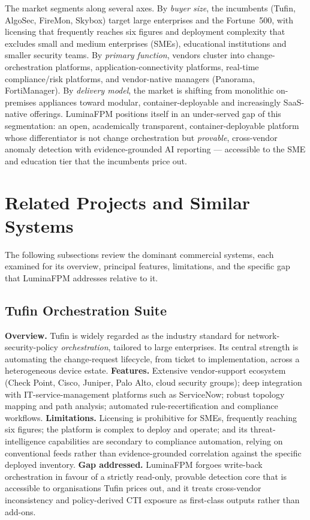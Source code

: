 The market segments along several axes. By \emph{buyer size}, the incumbents (Tufin, AlgoSec, FireMon, Skybox) target large enterprises and the Fortune~500, with licensing that frequently reaches six figures and deployment complexity that excludes small and medium enterprises (SMEs), educational institutions and smaller security teams. By \emph{primary function}, vendors cluster into change-orchestration platforms, application-connectivity platforms, real-time compliance/risk platforms, and vendor-native managers (Panorama, FortiManager). By \emph{delivery model}, the market is shifting from monolithic on-premises appliances toward modular, container-deployable and increasingly SaaS-native offerings. LuminaFPM positions itself in an under-served gap of this segmentation: an open, academically transparent, container-deployable platform whose differentiator is not change orchestration but \emph{provable}, cross-vendor anomaly detection with evidence-grounded AI reporting --- accessible to the SME and education tier that the incumbents price out.

\section{Related Projects and Similar Systems}
\label{sec:ch2-related}
The following subsections review the dominant commercial systems, each examined for its overview, principal features, limitations, and the specific gap that LuminaFPM addresses relative to it.

\subsection{Tufin Orchestration Suite}
\textbf{Overview.} Tufin is widely regarded as the industry standard for network-security-policy \emph{orchestration}, tailored to large enterprises. Its central strength is automating the change-request lifecycle, from ticket to implementation, across a heterogeneous device estate.
\textbf{Features.} Extensive vendor-support ecosystem (Check Point, Cisco, Juniper, Palo Alto, cloud security groups); deep integration with IT-service-management platforms such as ServiceNow; robust topology mapping and path analysis; automated rule-recertification and compliance workflows.
\textbf{Limitations.} Licensing is prohibitive for SMEs, frequently reaching six figures; the platform is complex to deploy and operate; and its threat-intelligence capabilities are secondary to compliance automation, relying on conventional feeds rather than evidence-grounded correlation against the specific deployed inventory.
\textbf{Gap addressed.} LuminaFPM forgoes write-back orchestration in favour of a strictly read-only, provable detection core that is accessible to organisations Tufin prices out, and it treats cross-vendor inconsistency and policy-derived CTI exposure as first-class outputs rather than add-ons.

